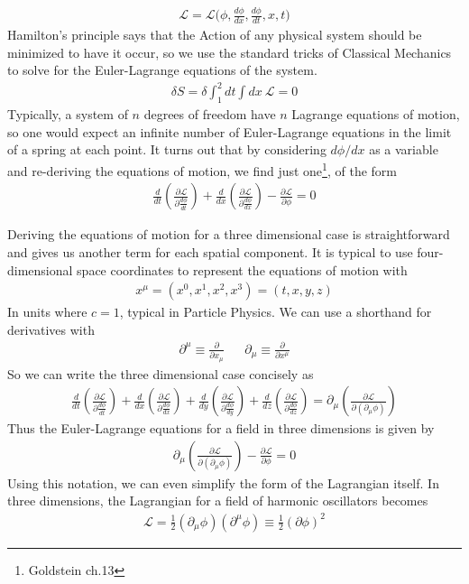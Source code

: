 \begin{align}
    \mathcal{L} = \mathcal{L}\Big(\phi, \frac{d\phi}{dx},\frac{d\phi}{dt}, x,t\Big)
\end{align}
Hamilton's principle says that the Action of any physical system should be minimized to have it occur, so we use the standard tricks of Classical Mechanics to solve for the Euler-Lagrange equations of the system.
\begin{align}
    \delta S = \delta\int_1^2 dt \int dx ~\mathcal{L} = 0
\end{align}
Typically, a system of $n$ degrees of freedom have $n$ Lagrange equations of motion, so one would expect an infinite number of Euler-Lagrange equations in the limit of a spring at each point. It turns out that by considering $d\phi/dx$ as a variable and re-deriving the equations of motion, we find just one\footnote{Goldstein ch.13}, of the form
\begin{align}
    \frac{d}{dt}\left(\frac{\partial\mathcal{L}}{\partial\frac{d\phi}{dt}}\right) + \frac{d}{dx}\left(\frac{\partial\mathcal{L}}{\partial \frac{d\phi}{dx}}\right) - \frac{\partial\mathcal{L}}{\partial \phi} = 0
\end{align}

Deriving the equations of motion for a three dimensional case is straightforward and gives us another term for each spatial component. It is typical to use four-dimensional space coordinates to represent the equations of motion with
\begin{align}
    x^\mu = (x^0, x^1, x^2, x^3) = (t, x, y,z)
\end{align}
In units where $c=1$, typical in Particle Physics. We can use a shorthand for derivatives with 
\begin{align}
    \partial^\mu \equiv \frac{\partial}{\partial x_\mu} && \partial_\mu \equiv \frac{\partial}{\partial x^\mu}
\end{align}
So we can write the three dimensional case concisely as
\begin{align}
    \frac{d}{dt}\left(\frac{\partial\mathcal{L}}{\partial\frac{d\phi}{dt}}\right) + \frac{d}{dx}\left(\frac{\partial\mathcal{L}}{\partial \frac{d\phi}{dx}}\right) +\frac{d}{dy}\left(\frac{\partial\mathcal{L}}{\partial \frac{d\phi}{dy}}\right) + \frac{d}{dz}\left(\frac{\partial\mathcal{L}}{\partial \frac{d\phi}{dz}}\right) = \partial_\mu \left(\frac{\partial\mathcal{L}}{\partial(\partial_\mu\phi)}\right)
\end{align}
Thus the Euler-Lagrange equations for a field in three dimensions is given by
\begin{align}\label{euler-lagrange}
    \boxed{\partial_\mu \left(\frac{\partial\mathcal{L}}{\partial(\partial_\mu\phi)}\right) - \frac{\partial\mathcal{L}}{\partial \phi} = 0}
\end{align}
Using this notation, we can even simplify the form of the Lagrangian itself. In three dimensions, the Lagrangian for a field of harmonic oscillators becomes
\begin{align}\label{harm-osc-lagrange}
    \mathcal{L} = \frac{1}{2}(\partial_\mu\phi)(\partial^\mu \phi) \equiv \frac{1}{2}(\partial\phi)^2
\end{align}

